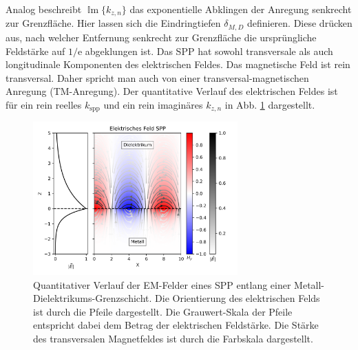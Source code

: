 \documentclass[titlepage,  ngerman]{article}
\renewcommand{\Im}{\operatorname{\mathbb{I}m}}
\begin{document}
	Analog beschreibt $\Im\{k_{z, n}\}$ das exponentielle Abklingen der Anregung senkrecht zur Grenzfläche. Hier lassen sich die Eindringtiefen $\delta_{M,D}$ definieren. Diese drücken aus, nach welcher Entfernung senkrecht zur Grenzfläche die ursprüngliche Feldstärke auf $1/\mathrm{e}$ abgeklungen ist. Das SPP hat sowohl transversale als auch longitudinale Komponenten des elektrischen Feldes. Das magnetische Feld ist rein transversal. Daher spricht man auch von einer transversal-magnetischen Anregung (TM-Anregung).
	Der quantitative Verlauf des elektrischen Feldes ist für ein rein reelles $k_{\mathrm{spp}}$ und ein rein imaginäres $k_{z, n}$ in Abb. \ref{fig:electric_field_spp} dargestellt.
	\begin{figure}[htbp] 
		\centering
		\includegraphics[width=0.7\textwidth]{figures/E_Feld_SPP.png}
		\caption[Elektrisches Feld SPP]{Quantitativer Verlauf der EM-Felder eines SPP entlang einer Metall-Dielektrikums-Grenzschicht. Die Orientierung des elektrischen Felds ist durch die Pfeile dargestellt. Die Grauwert-Skala der Pfeile entspricht dabei dem Betrag der elektrischen Feldstärke. Die Stärke des transversalen Magnetfeldes ist durch die Farbskala dargestellt.}
		\label{fig:electric_field_spp}
	\end{figure}
	
\end{document}

